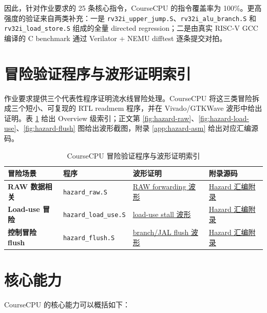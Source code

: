 \documentclass[UTF8,a4paper,12pt]{ctexrep}
\begin{document}
因此，针对作业要求的 25 条核心指令，CourseCPU 的指令覆盖率为 100\%。更高强度的验证来自两类补充：一是 \texttt{rv32i\_upper\_jump.S}、\texttt{rv32i\_alu\_branch.S} 和 \texttt{rv32i\_load\_store.S} 组成的全量 directed regression；二是由真实 RISC-V GCC 编译的 C benchmark 通过 Verilator + NEMU difftest 逐条提交对拍。

\section{冒险验证程序与波形证明索引}

作业要求提供三个代表性程序证明流水线冒险处理。CourseCPU 将这三类冒险拆成三个短小、可复现的 RTL readmem 程序，并在 Vivado/GTKWave 波形中给出证明。表 \ref{tab:overview-hazard-proof} 给出 Overview 级索引；正文第 \ref{fig:hazard-raw}、\ref{fig:hazard-load-use}、\ref{fig:hazard-flush} 图给出波形截图，附录 \ref{app:hazard-asm} 给出对应汇编源码。

\begin{table}[H]
  \centering
  \caption{CourseCPU 冒险验证程序与波形证明索引}
  \label{tab:overview-hazard-proof}
  \begin{tabularx}{\textwidth}{>{\bfseries}lXXX}
    \toprule
    冒险场景 & 程序 & 波形证明 & 附录源码 \\
    \midrule
    RAW 数据相关 & \texttt{hazard\_raw.S} & \hyperref[fig:hazard-raw]{RAW forwarding 波形} & \hyperref[app:hazard-asm]{Hazard 汇编附录} \\
    Load-use 冒险 & \texttt{hazard\_load\_use.S} & \hyperref[fig:hazard-load-use]{load-use stall 波形} & \hyperref[app:hazard-asm]{Hazard 汇编附录} \\
    控制冒险 flush & \texttt{hazard\_flush.S} & \hyperref[fig:hazard-flush]{branch/JAL flush 波形} & \hyperref[app:hazard-asm]{Hazard 汇编附录} \\
    \bottomrule
  \end{tabularx}
\end{table}

\section{核心能力}

CourseCPU 的核心能力可以概括如下：
\end{document}
